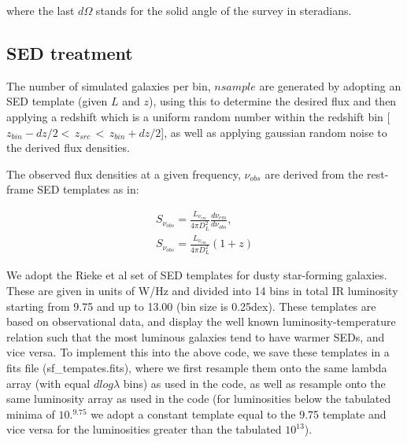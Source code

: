 \documentclass{emulateapj}
\begin{document}
where the last $d\Omega$ stands for the solid angle of the survey in steradians.%

 
 
 \subsection{SED treatment}
 
 The number of simulated galaxies per bin, $nsample$ are generated by adopting an SED template (given $L$ and $z$), using this to determine the desired flux and then applying a redshift which is a uniform random number within the redshift bin [$z_{bin}-dz/2$$<$\,$z_{src}$\,$<$\,$z_{bin}+dz/2$], as well as applying gaussian random noise to the derived flux densities. 
  
  The observed flux densities at a given frequency, $\nu_{obs}$ are derived from the rest-frame SED templates as in:



\begin{eqnarray}
S_{\nu_{obs}}=\frac{L_{\nu_{em}}}{4\pi D_L^2}\frac{d\nu_{em}}{d\nu_{obs}}, \\
S_{\nu_{obs}}=\frac{L_{\nu_{em}}}{4\pi D_L^2}(1+z) \nonumber
\end{eqnarray}

We adopt the Rieke et al set of SED templates for dusty star-forming galaxies. These are given in units of W/Hz and divided into 14 bins in total IR luminosity starting from 9.75 and up to 13.00 (bin size is 0.25dex). These templates are based on observational data, and display the well known luminosity-temperature relation such that the most luminous galaxies tend to have warmer SEDs, and vice versa. To implement this into the above code, we save these templates in a fits file (sf\_tempates.fits), where we first resample them onto the same lambda array (with equal $dlog\lambda$ bins) as used in the code, as well as resample onto the same luminosity array as used in the code (for luminosities below the tabulated minima of $10.^{9.75}$ we adopt a constant template equal to the 9.75 template and vice versa for the luminosities greater than the tabulated $10^{13}$).  
\end{document}
